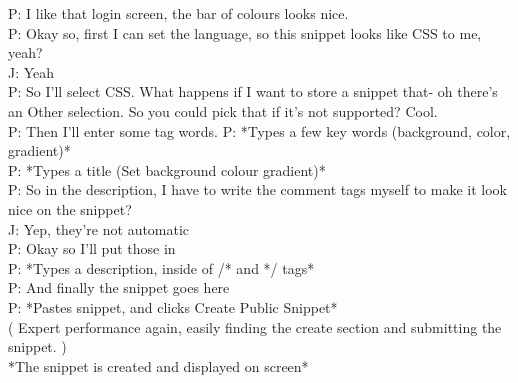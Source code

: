 P: I like that login screen, the bar of colours looks nice. \\
P: Okay so, first I can set the language, so this snippet looks like CSS to me, yeah? \\
J: \-\hspace{1.4cm}Yeah \\
P: So I'll select CSS. What happens if I want to store a snippet that- oh there's an Other selection. So you could pick that if it's not supported? Cool.  \\
P: Then I'll enter some tag words. 
P: *Types a few key words (background, color, gradient)*  \\
P: *Types a title (Set background colour gradient)* \\
P: So in the description, I have to write the comment tags myself to make it look nice on the snippet? \\
J: \-\hspace{1.4cm}Yep, they're not automatic \\
P: Okay so I'll put those in  \\
P: *Types a description, inside of /* and */ tags* \\
P: And finally the snippet goes here  \\
P: *Pastes snippet, and clicks Create Public Snippet* \\
( Expert performance again, easily finding the create section and submitting the snippet. ) \\
*The snippet is created and displayed on screen*

